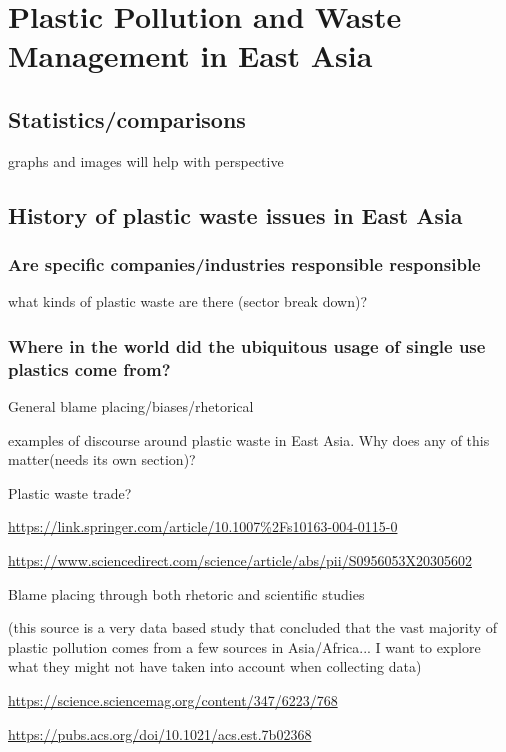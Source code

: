 \documentclass{book}\usepackage{knitr}
\begin{document}
\section{Plastic Pollution and Waste Management in East Asia} 

\subsection{Statistics/comparisons}

graphs and images will help with perspective

\subsection{History of plastic waste issues in East Asia}

\subsubsection{Are specific companies/industries responsible responsible}

what kinds of plastic waste are there (sector break down)? 

\subsubsection{Where in the world did the ubiquitous usage of single use plastics come from?}

General blame placing/biases/rhetorical 

examples of discourse around plastic waste in East Asia. Why does any of this matter(needs its own section)?

Plastic waste trade? 

\url{https://link.springer.com/article/10.1007%2Fs10163-004-0115-0}

\url{https://www.sciencedirect.com/science/article/abs/pii/S0956053X20305602}

Blame placing through both rhetoric and scientific studies

(this source is a very data based study that concluded that the vast majority of plastic pollution comes from a few sources in Asia/Africa... I want to explore what they might not have taken into account when collecting data)

\url{https://science.sciencemag.org/content/347/6223/768}

\url{https://pubs.acs.org/doi/10.1021/acs.est.7b02368}
\end{document}
